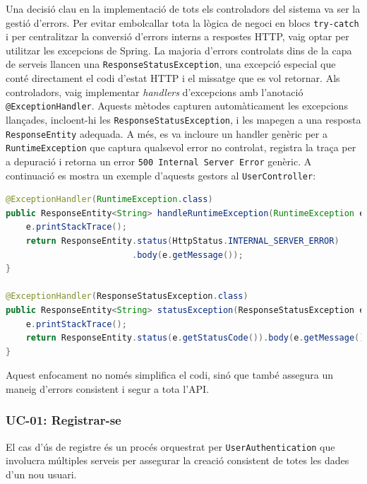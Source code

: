 Una decisió clau en la implementació de tots els controladors del sistema va ser la gestió d'errors. Per evitar embolcallar tota la lògica de negoci en blocs \texttt{try-catch} i per centralitzar la conversió d'errors interns a respostes HTTP, vaig optar per utilitzar les excepcions de Spring. La majoria d'errors controlats dins de la capa de serveis llancen una \texttt{ResponseStatusException}, una excepció especial que conté directament el codi d'estat HTTP i el missatge que es vol retornar. Als controladors, vaig implementar \textit{handlers} d'excepcions amb l'anotació \texttt{@ExceptionHandler}. Aquests mètodes capturen automàticament les excepcions llançades, incloent-hi les \texttt{ResponseStatusException}, i les mapegen a una resposta \texttt{ResponseEntity} adequada. A més, es va incloure un handler genèric per a \texttt{RuntimeException} que captura qualsevol error no controlat, registra la traça per a depuració i retorna un error \texttt{500 Internal Server Error} genèric. A continuació es mostra un exemple d'aquests gestors al \texttt{UserController}:

\begin{lstlisting}[language=Java, caption={Exemple de gestors d'excepcions al UserController.}, label={lst:exception_handlers_user_controller}]
@ExceptionHandler(RuntimeException.class)
public ResponseEntity<String> handleRuntimeException(RuntimeException e) {
    e.printStackTrace();
    return ResponseEntity.status(HttpStatus.INTERNAL_SERVER_ERROR)
                         .body(e.getMessage());
}

@ExceptionHandler(ResponseStatusException.class)
public ResponseEntity<String> statusException(ResponseStatusException e) {
    e.printStackTrace();
    return ResponseEntity.status(e.getStatusCode()).body(e.getMessage());
}
\end{lstlisting}

Aquest enfocament no només simplifica el codi, sinó que també assegura un maneig d'errors consistent i segur a tota l'API.

\subsubsection{UC-01: Registrar-se}

El cas d'ús de registre és un procés orquestrat per \texttt{UserAuthentication} que involucra múltiples serveis per assegurar la creació consistent de totes les dades d'un nou usuari.

